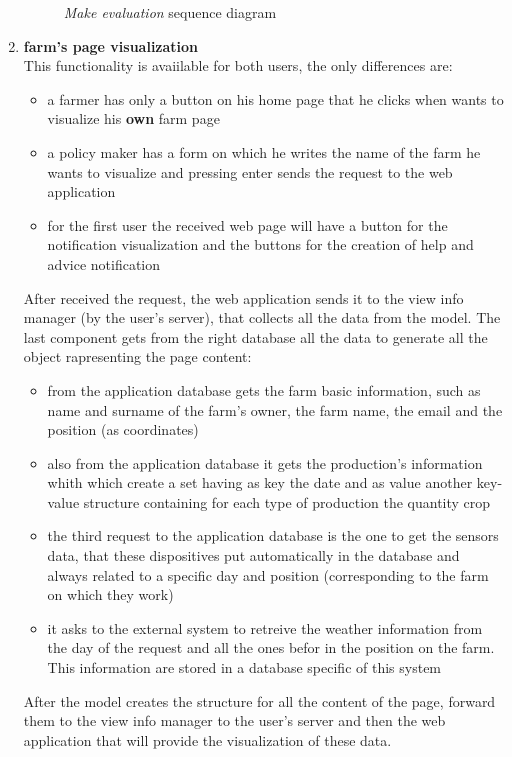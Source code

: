 \begin{enumerate}
\begin{figure}[H]
\begin{center}
        \caption{\emph{Make evaluation} sequence diagram}
        \label{fig:sequence6}
        \end{center}
    \end{figure}
    \item \textbf{farm's page visualization}\\
    This functionality is avaiilable for both users, the only differences are:
    \begin{itemize}
        \item a farmer has only a button on his home page that he clicks when wants to visualize his \textbf{own} farm page
        \item a policy maker has a form on which he writes the name of the farm he wants to visualize and pressing enter sends the request to the web application
        \item for the first user the received web page will have a button for the notification visualization and the buttons for the creation of  help and advice notification
    \end{itemize}
    After received the request, the web application sends it to the view info manager (by the user's server), that collects all the data from the model. The last component gets from the right database all the data to generate all the object rapresenting the page content:
    \begin{itemize}
        \item from the application database gets the farm basic information, such as name and surname of the farm's owner, the farm name, the email and the position (as coordinates)
        \item also from the application database it gets the production's information whith which create a set having as key the date and as value another key-value structure containing for each type of production the quantity crop 
        \item the third request to the application database is the one to get the sensors data, that these dispositives put automatically in the database and always related to a specific day and position (corresponding to the farm on which they work)
        \item it asks to the external system to retreive the weather information from the day of the request and all the ones befor in the position on the farm. This information are stored in a database specific of this system
    \end{itemize}
    After the model creates the structure for all the content of the page, forward them to the view info manager to the user's server and then the web application that will provide the visualization of these data.

\end{enumerate}
